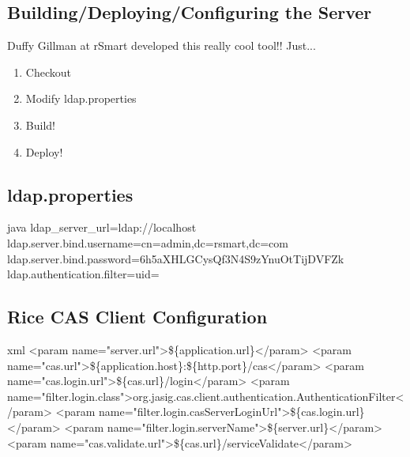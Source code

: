 \documentclass[12pt,notitlepage]{article}
\begin{document}
\begin{s5presentation}
%
%
  \W \begin{s5slide}
    \section{Building/Deploying/Configuring the Server}
    Duffy Gillman at rSmart developed this really cool tool!! Just...
    \begin{enumerate}
      \item Checkout
      \item Modify ldap.properties
      \item Build!
      \item Deploy!
    \end{enumerate}
    \W \end{s5slide}

%
%
  \W \begin{s5slide}
    \section{ldap.properties}
\begin{code}{java}
ldap_server_url=ldap://localhost
ldap.server.bind.username=cn=admin,dc=rsmart,dc=com
ldap.server.bind.password=6h5aXHLGCysQf3N4S9zYnuOtTijDVFZk
ldap.authentication.filter=uid=%
\end{code}
\end{s5slide}

%
%
  \W \begin{s5slide}
    \section{Rice CAS Client Configuration}
    
    \begin{code}{xml}
  <param name="server.url">\$\{application.url\}</param>
  <param name="cas.url">\$\{application.host\}:\$\{http.port\}/cas</param>
  <param name="cas.login.url">\$\{cas.url\}/login</param>
  <param name="filter.login.class">org.jasig.cas.client.authentication.AuthenticationFilter</param>
  <param name="filter.login.casServerLoginUrl">\$\{cas.login.url\}</param>
  <param name="filter.login.serverName">\$\{server.url\}</param>
  <param name="cas.validate.url">\$\{cas.url\}/serviceValidate</param>
    \end{code}
    

\end{s5slide}
\end{s5presentation}
\end{document}
